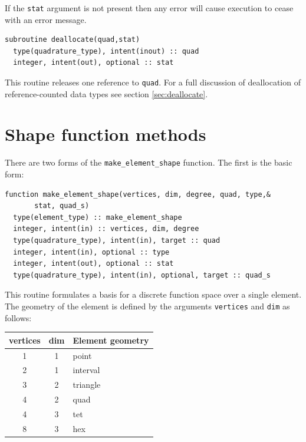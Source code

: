 \documentclass[a4paper, 11pt]{book}
\begin{document}
If the \lstinline+stat+ argument is not present then any error will cause
execution to cease with an error message.


\begin{lstlisting}
subroutine deallocate(quad,stat)
  type(quadrature_type), intent(inout) :: quad
  integer, intent(out), optional :: stat
\end{lstlisting}

This routine releases one reference to \lstinline+quad+. For a full
discussion of deallocation of reference-counted data types see section
\ref{sec:deallocate}.

\section{Shape function methods}


There are two forms of the \lstinline+make_element_shape+ function. The
first is the basic form:

\begin{lstlisting}
function make_element_shape(vertices, dim, degree, quad, type,&
       stat, quad_s)  
  type(element_type) :: make_element_shape
  integer, intent(in) :: vertices, dim, degree
  type(quadrature_type), intent(in), target :: quad
  integer, intent(in), optional :: type
  integer, intent(out), optional :: stat
  type(quadrature_type), intent(in), optional, target :: quad_s
\end{lstlisting}

This routine formulates a basis for a discrete function space over a single
element. The geometry of the element is defined by the arguments
\lstinline+vertices+ and \lstinline+dim+ as follows:
\begin{center}
  \begin{tabular}{ccl}
    \textbf{vertices} & \textbf{dim} & \textbf{Element geometry}\\\hline
    1 & 1 & point\\
    2 & 1 & interval\\
    3 & 2 & triangle\\
    4 & 2 & quad\\
    4 & 3 & tet\\
    8 & 3 & hex
  \end{tabular}
\end{center}
\end{document}
